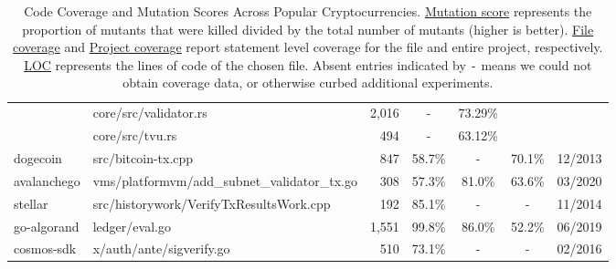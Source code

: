 \begin{table}[ht!]
\begin{tabular}{llrcccc}
                                & core/src/validator.rs                         & 2,016            & -                       & 73.29\%                 &                          &                                        \\
                                & core/src/tvu.rs                               &  494             & -                       & 63.12\%                 &                          &                                        \\
\cmidrule{2-7}
dogecoin                        & src/bitcoin-tx.cpp                            & 847              & 58.7\%                  & -                       & 70.1\%                   & 12/2013                              \\
\cmidrule{2-7}
avalanchego                     & vms/platformvm/add\_subnet\_validator\_tx.go  & 308              & 57.3\%                  & 81.0\%                  & 63.6\%                   & 03/2020                              \\
\cmidrule{2-7}
  stellar                       & src/historywork/VerifyTxResultsWork.cpp       & 192              & 85.1\%                  & -                       & -                        & 11/2014                              \\
\cmidrule{2-7}
go-algorand                     & ledger/eval.go                                & 1,551            & 99.8\%                  & 86.0\%                  & 52.2\%                   & 06/2019                               \\
\cmidrule{2-7}
cosmos-sdk                      & x/auth/ante/sigverify.go                      & 510              & 73.1\%                  & -                       &  -                       & 02/2016                              \\
\bottomrule
\end{tabular}
\caption{Code Coverage and Mutation Scores Across Popular Cryptocurrencies. \underline{Mutation score} represents the proportion of mutants that were killed divided by the total number of mutants (higher is better).
\underline{File coverage} and \underline{Project coverage} report statement level coverage for the file and entire project, respectively. \underline{LOC} represents the lines of code of the chosen file. Absent entries indicated by \texttt{-} means we could not
obtain coverage data, or otherwise curbed additional experiments.
}
\label{tab:comparison}
\end{table}

